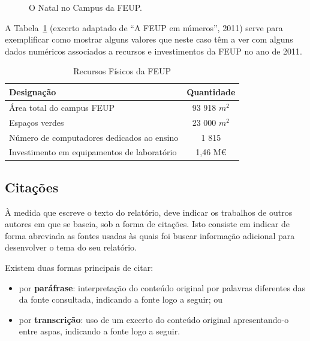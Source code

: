 \documentclass[11pt,a4paper]{report}
\begin{document}
\lipsum[4]

\begin{figure} [b]
  \centering
  \caption{O Natal no Campus da FEUP.} \label{fig:natal}
\end{figure}

\lipsum[4]

A Tabela~\ref{tab:feup} (excerto adaptado de ``A FEUP em números'', 2011)
serve para exemplificar como mostrar alguns valores que neste caso têm
a ver com alguns dados numéricos associados a recursos e investimentos
da FEUP no ano de 2011.

\lipsum[4]

\begin{table}
  \centering
  \caption{Recursos Físicos da FEUP}
  \begin{tabular}{| l | c |}
    \hline
    \textbf{Designação} & \textbf{Quantidade}\\\hline
    \hline
    Área total do campus FEUP & 93 918 $m^2$\\\hline
    Espaços verdes & 23 000 $m^2$\\\hline
    Número de computadores dedicados ao ensino & 1 815\\\hline
    Investimento em equipamentos de laboratório & 1,46 M€\\
    \hline
  \end{tabular}
  \label{tab:feup}
\end{table}

\lipsum[4]

\subsection*{Citações}

À medida que escreve o texto do relatório, deve indicar os trabalhos
de outros autores em que se baseia, sob a forma de citações.
Isto consiste em indicar de forma abreviada as fontes usadas às quais
foi buscar informação adicional para desenvolver o tema do seu
relatório.

Existem duas formas principais de citar:
\begin{itemize}
\item por \textbf{paráfrase}: interpretação do conteúdo original por
  palavras diferentes das da fonte consultada, indicando a fonte logo
  a seguir; ou 
\item 
  por \textbf{transcrição}: uso de um excerto do conteúdo original
  apresentando-o entre aspas, indicando a fonte logo a seguir.
\end{itemize}
\end{document}
